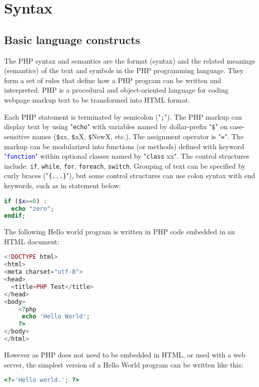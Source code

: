 \chapter{Syntax}


\section{Basic language constructs}


The PHP syntax and semantics are the format (syntax) and the related meanings (semantics) of the text and symbols in the PHP programming language. They form a set of rules that define how a PHP program can be written and interpreted. PHP is a procedural and object-oriented language for coding webpage markup text to be transformed into HTML format.


Each PHP statement is terminated by semicolon ("\texttt{;}"). The PHP markup can display text by using "\texttt{echo}" with variables named by dollar-prefix "\texttt{\$}" on case-sensitive names (\texttt{\$}xx, \texttt{\$}xX, \texttt{\$}NewX, etc.). The assignment operator is "\texttt{=}". The markup can be modularized into functions (or methods) defined with keyword "\textcolor{Blue}{\texttt{function}}" within optional classes named by "\texttt{class} xx". The control structures include: \texttt{if}, \texttt{while}, \texttt{for}, \texttt{foreach}, \texttt{switch}. Grouping of text can be specified by curly braces ("\texttt{\{...\}}"), but some control structures can use colon syntax with end keywords, such as in statement below:

\begin{lstlisting}[language=PHP]
if ($x==0) : 
  echo "zero"; 
endif;
\end{lstlisting}


The following Hello world program is written in PHP code embedded in an HTML document:

\begin{lstlisting}[language=PHP]
<!DOCTYPE html>
<html>
<meta charset="utf-8">
<head>
  <title>PHP Test</title>
</head>
<body>
	<?php
	 echo 'Hello World';
	?>
</body>
</html>
\end{lstlisting}




However as PHP does not need to be embedded in HTML, or used with a web server, the simplest version of a Hello World program can be written like this:

\begin{lstlisting}[language=PHP]
<?='Hello world.'; ?>
\end{lstlisting}

